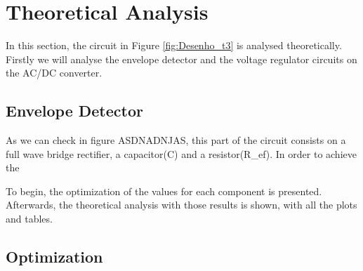 
\section{Theoretical Analysis}
\label{sec:analysis}



In this section, the circuit in Figure \ref{fig:Desenho_t3} is analysed theoretically. Firstly we will analyse the envelope detector and the voltage regulator circuits on the AC/DC converter.


\subsection{Envelope Detector}
\label{subsec:envelope}

As we can check in figure ASDNADNJAS, this part of the circuit consists on a full wave bridge rectifier, a capacitor(C) and a resistor(R_ef). In order to achieve the



To begin, the optimization of the values for each component is presented. Afterwards,
the theoretical analysis with those results is shown, with all the plots and tables.



\subsection{Optimization}
\label{subsec:optim}

